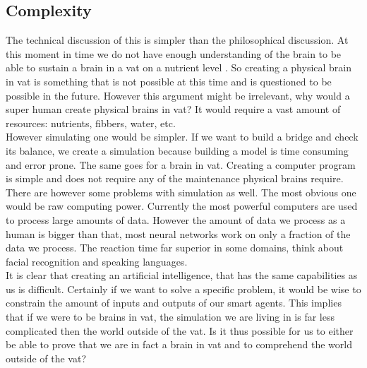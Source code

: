 \documentclass[a4paper]{article}
\begin{document}
\subsection{Complexity}
The technical discussion of this is simpler than the philosophical discussion. At this moment in time we do not have enough understanding of the brain to be able to sustain a brain in a vat on a nutrient level \cite{isolated}. So creating a physical brain in vat is something that is not possible at this time and is questioned to be possible in the future. However this argument might be irrelevant, why would a super human create physical brains in vat? It would require a vast amount of resources: nutrients, fibbers, water, etc.\\
However simulating one would be simpler. If we want to build a bridge and check its balance, we create a simulation because building a model is time consuming and error prone. The same goes for a brain in vat. Creating a computer program is simple and does not require any of the maintenance physical brains require.\\
There are however some problems with simulation as well. The most obvious one would be raw computing power. Currently the most powerful computers are used to process large amounts of data. However the amount of data we process as a human is bigger than that, most neural networks work on only a fraction of the data we process. The reaction time far superior in some domains, think about facial recognition and speaking languages.\\
It is clear that creating an artificial intelligence, that has the same capabilities as us is difficult. Certainly if we want to solve a specific problem, it would be wise to constrain the amount of inputs and outputs of our smart agents. This implies that if we were to be brains in vat, the simulation we are living in is far less complicated then the world outside of the vat. Is it thus possible for us to either be able to prove that we are in fact a brain in vat and to comprehend the world outside of the vat?
\end{document}
